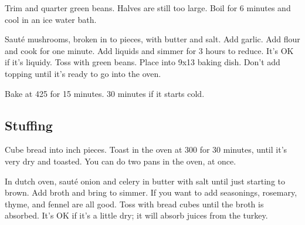 \begin{recipe}
Trim and quarter green beans. Halves are still too large. Boil for 6 minutes and cool in an ice water bath.


Sauté mushrooms, broken in to pieces, with butter and salt. Add garlic. Add flour and cook for one minute. Add liquids and simmer for 3 hours to reduce. It's OK if it's liquidy. Toss with green beans. Place into 9x13 baking dish. Don't add topping until it's ready to go into the oven.

Bake at 425\degree{} for 15 minutes. 30 minutes if it starts cold. 

\subsection{Stuffing}



Cube bread into  inch pieces. Toast in the oven at 300\degree{} for 30 minutes, until it's very dry and toasted. You can do two pans in the oven, at once. 



In dutch oven, sauté onion and celery in butter with salt until just starting to brown. Add broth and bring to simmer. If you want to add seasonings, rosemary, thyme, and fennel are all good. Toss with bread cubes until the broth is absorbed. It's OK if it's a little dry; it will absorb juices from the turkey. 


\end{recipe}
